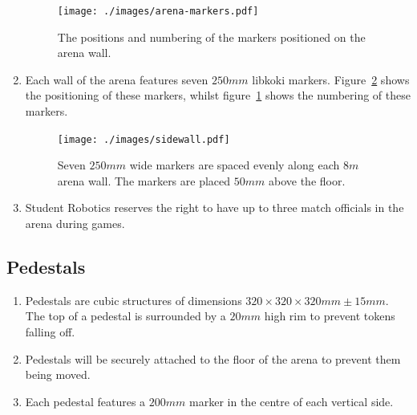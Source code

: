 \begin{enumerate}
  \begin{figure}
    \centering
    \texttt{[image: ./images/arena-markers.pdf]}
    \caption{The positions and numbering of the markers positioned on the arena wall.}
    \label{fig:arena-zones}
  \end{figure}

\item Each wall of the arena features seven $250mm$ libkoki markers.
      Figure~\ref{fig:arena-wall} shows the positioning of these markers, whilst figure~\ref{fig:arena-zones} shows the numbering of these markers.

  \begin{figure}
    \centering
    \texttt{[image: ./images/sidewall.pdf]}
    \caption{Seven $250mm$ wide markers are spaced evenly along each $8m$ arena wall.
             The markers are placed $50mm$ above the floor.}
    \label{fig:arena-wall}
  \end{figure}

\item Student Robotics reserves the right to have up to three match officials in the arena during games.

\end{enumerate}

\subsection{Pedestals}
\label{sub:pedestals}
\begin{enumerate}
\item Pedestals are cubic structures of dimensions $320 \times 320 \times 320mm \pm 15mm$.
      The top of a pedestal is surrounded by a $20mm$ high rim to prevent tokens falling off.

\item Pedestals will be securely attached to the floor of the arena to prevent them being moved.

\item Each pedestal features a $200mm$ marker in the centre of each vertical side.

\end{enumerate}

